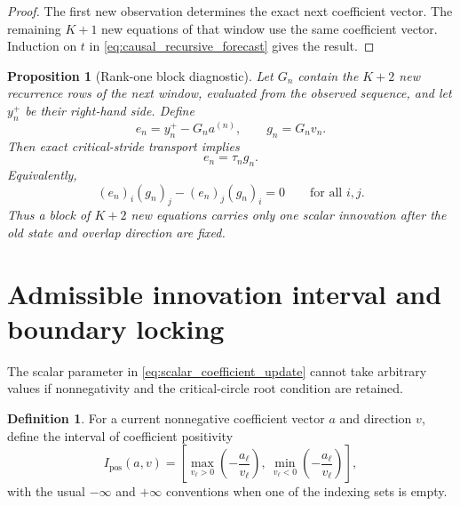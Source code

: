 \documentclass[11pt]{amsart}
\numberwithin{equation}{section}
\theoremstyle{plain}
\newtheorem{proposition}[theorem]{Proposition}
\theoremstyle{definition}
\newtheorem{definition}[theorem]{Definition}
\theoremstyle{remark}
\begin{document}
\begin{proof}
The first new observation determines the exact next coefficient vector.  The remaining $K+1$ new equations of that window use the same coefficient vector.  Induction on $t$ in \eqref{eq:causal_recursive_forecast} gives the result.
\end{proof}

\begin{proposition}[Rank-one block diagnostic]
\label{prop:rank_one_block_diagnostic}
Let $G_n$ contain the $K+2$ new recurrence rows of the next window, evaluated from the observed sequence, and let $y_n^+$ be their right-hand side.  Define
\begin{equation}
e_n=y_n^+-G_na^{(n)},
\qquad
g_n=G_nv_n.
\label{eq:block_residual_vectors}
\end{equation}
Then exact critical-stride transport implies
\begin{equation}
e_n=\tau_ng_n.
\label{eq:block_collinearity}
\end{equation}
Equivalently,
\begin{equation}
(e_n)_i(g_n)_j-(e_n)_j(g_n)_i=0
\qquad
\text{for all }i,j.
\label{eq:block_minor_identities}
\end{equation}
Thus a block of $K+2$ new equations carries only one scalar innovation after the old state and overlap direction are fixed.
\end{proposition}

\section{Admissible innovation interval and boundary locking}
\label{sec:innovation_interval}

The scalar parameter in \eqref{eq:scalar_coefficient_update} cannot take arbitrary values if nonnegativity and the critical-circle root condition are retained.

\begin{definition}
\label{def:positive_tau_interval}
For a current nonnegative coefficient vector $a$ and direction $v$, define the interval of coefficient positivity
\begin{equation}
I_{\mathrm{pos}}(a,v)
=
\left[
\max_{v_\ell>0}\left(-\frac{a_\ell}{v_\ell}\right),
\ 
\min_{v_\ell<0}\left(-\frac{a_\ell}{v_\ell}\right)
\right],
\label{eq:positive_tau_interval}
\end{equation}
with the usual $-\infty$ and $+\infty$ conventions when one of the indexing sets is empty.
\end{definition}
\end{document}

